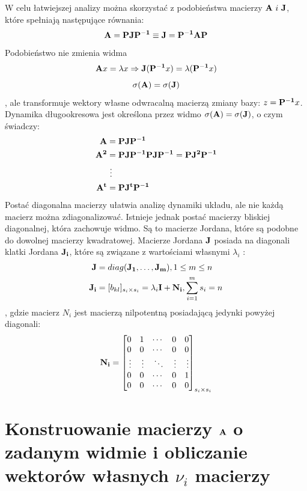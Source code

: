 \documentclass{article}
\begin{document}
W celu łatwiejszej analizy można skorzystać z podobieństwa macierzy $\bold{A}~i~\bold{J}$, które spełniają następujące równania:
\[
\bold{A} = \bold{PJP^{-1}} \equiv \bold{J} = \bold{P^{-1}AP}
\]
Podobieństwo nie zmienia widma
\[
\bold{A}x=\lambda x \Rightarrow \bold{J(P^{-1}}x) = \lambda(\bold{P^{-1}}x)
\]
\[
\sigma(\bold{A}) = \sigma(\bold{J})
\]
, ale transformuje wektory własne odwracalną macierzą zmiany bazy: $z = \bold{P^{-1}}x$.
\newline \newline
Dynamika długookresowa jest okre\'slona przez widmo $\sigma(\bold{A}) = \sigma(\bold{J})$, o czym \'swiadczy:
\begin{gather*}
\begin{aligned}
\bold{A} &= \bold{PJP^{-1}} \\
\bold{A^2} &= \bold{PJP^{-1}PJP^{-1}}=\bold{PJ^2P^{-1}}\\
&~\vdots\\
\bold{A^t} &= \bold{PJ^tP^{-1}}
\end{aligned}
\end{gather*}
Postać diagonalna macierzy ułatwia analizę dynamiki układu, ale nie każdą macierz można zdiagonalizować. Istnieje jednak postać macierzy bliskiej diagonalnej, która zachowuje widmo. Są to macierze Jordana, które są podobne do dowolnej macierzy kwadratowej. Macierze Jordana $\bold{J}$ posiada na diagonali klatki Jordana $\bold{J_i}$, które są związane z warto\'sciami własnymi $\lambda_i$ :
\begin{gather*}
\begin{aligned}
\bold{J} &= diag(\bold{J_1,\dots,J_m}), 1 \le m \le n \\
\bold{J_i} &= [b_{kl}]_{s_i \times s_i} = \lambda_i\bold{I} +\bold{N_i}, \sum_{i=1}^{m} s_i = n
\end{aligned}
\end{gather*}
, gdzie macierz $N_i$ jest macierzą nilpotentną posiadającą jedynki powyżej diagonali:
\[
\bold{N_i}=\begin{bmatrix*}[r]
  0 & 1 & \cdots & 0 & 0\\
  0 & 0 & \cdots & 0 & 0\\
  \vdots&\vdots&\ddots&\vdots&\vdots\\
  0 & 0 & \cdots & 0 & 1\\
  0 & 0 & \cdots & 0 & 0
 \end{bmatrix*}_{s_i \times s_i}
\]
\pagebreak

\section{Konstruowanie macierzy $\bold{A}$ o zadanym widmie i obliczanie wektorów własnych $\nu_i$ macierzy}
\end{document}

